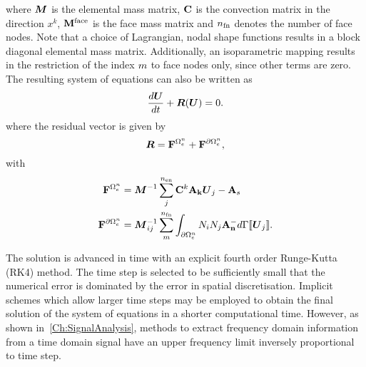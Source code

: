 where $\boldsymbol{M}$ is the elemental mass matrix, $\mathbf{C}$ is the
convection matrix in the direction $x^{k}$, $\mathbf{M}^{\textrm{face}}$ is the face
mass matrix and $n_\textrm{fn}$ denotes the number of face nodes. Note that a choice of
Lagrangian, nodal shape functions results in a block diagonal elemental mass
matrix. Additionally, an isoparametric mapping results in the restriction of the index $m$ to face nodes only, since
other terms are zero.
The resulting system of equations can also be written as
$$
\frac{d \boldsymbol{U}}{d t} + \boldsymbol{R}(\boldsymbol{U}) = 0.
$$
where the residual vector is given by
$$
\boldsymbol{R} = \mathbf{F}^{\Omega_e^{n}} + \mathbf{F}^{\partial \Omega_e^{n}} ,
$$
with
\begin{align}
  \mathbf{F}^{\Omega_e^{n}} &= \boldsymbol{M}^{-1} \sum_{j}^{n_\textrm{en}} \mathbf{C}^{k} \mathbf{A}_\mathbf{k} \boldsymbol{U}_j - \mathbf{A}_s \\
  \mathbf{F}^{\partial \Omega_e^{n}} &= \boldsymbol{M}_{ij}^{-1} \sum_{m}^{n_\textrm{fn}} \int_{\partial \Omega_e^{n}} N_i N_j \mathbf{A}_\mathbf{n}^{-} d\Gamma \llbracket \boldsymbol{U}_j \rrbracket .
\end{align}

The solution is advanced in time with an explicit fourth order Runge-Kutta (RK4)
method. The time step is selected to be sufficiently small that the numerical
error is dominated by the error in spatial discretisation. Implicit schemes which allow larger time steps may be employed to obtain the final solution of the system of equations in a shorter computational time. However, as shown in~\autoref{Ch:SignalAnalysis}, methods to extract frequency domain information from a time domain signal have an upper frequency limit inversely proportional to time step.




